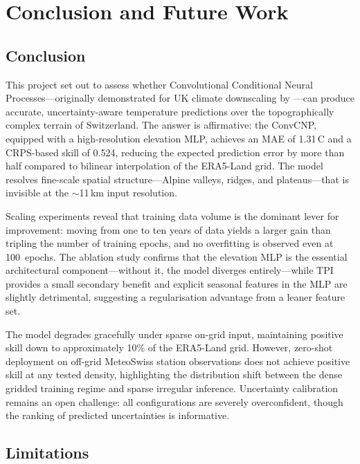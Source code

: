 \chapter{Conclusion and Future Work}

\section{Conclusion}

This project set out to assess whether Convolutional Conditional Neural Processes---originally demonstrated for UK climate downscaling by \citet{vaughan2022}---can produce accurate, uncertainty-aware temperature predictions over the topographically complex terrain of Switzerland. The answer is affirmative: the ConvCNP, equipped with a high-resolution elevation MLP, achieves an MAE of 1.31\,\textdegree C and a CRPS-based skill of 0.524, reducing the expected prediction error by more than half compared to bilinear interpolation of the ERA5-Land grid. The model resolves fine-scale spatial structure---Alpine valleys, ridges, and plateaus---that is invisible at the ${\sim}$11\,km input resolution.

Scaling experiments reveal that training data volume is the dominant lever for improvement: moving from one to ten years of data yields a larger gain than tripling the number of training epochs, and no overfitting is observed even at 100~epochs. The ablation study confirms that the elevation MLP is the essential architectural component---without it, the model diverges entirely---while TPI provides a small secondary benefit and explicit seasonal features in the MLP are slightly detrimental, suggesting a regularisation advantage from a leaner feature set.

The model degrades gracefully under sparse on-grid input, maintaining positive skill down to approximately 10\% of the ERA5-Land grid. However, zero-shot deployment on off-grid MeteoSwiss station observations does not achieve positive skill at any tested density, highlighting the distribution shift between the dense gridded training regime and sparse irregular inference. Uncertainty calibration remains an open challenge: all configurations are severely overconfident, though the ranking of predicted uncertainties is informative.

\section{Limitations}

